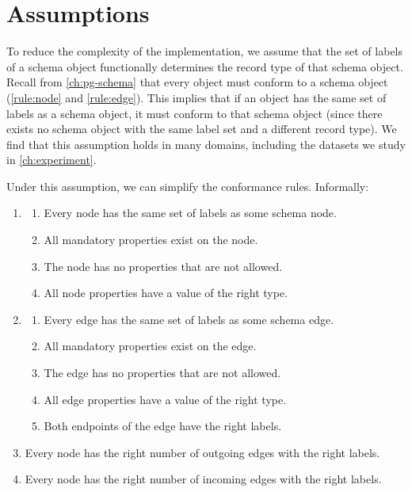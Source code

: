\documentclass{report}
\theoremstyle{definition}
\begin{document}

\section{Assumptions}

To reduce the complexity of the implementation, we assume that the set of labels of a schema object functionally determines the record type of that schema object. Recall from \autoref{ch:pg-schema} that every object must conform to a schema object (\autoref{rule:node} and \ref{rule:edge}). This implies that if an object has the same set of labels as a schema object, it must conform to that schema object (since there exists no schema object with the same label set and a different record type). We find that this assumption holds in many domains, including the datasets we study in \autoref{ch:experiment}.

Under this assumption, we can simplify the conformance rules. Informally:

\begin{enumerate}
  \item
        \begin{enumerate}
          \item\label{rule:simp-node-labels}
                Every node has the same set of labels as some schema node.
          \item\label{rule:simp-node-mandatory-props}
                All mandatory properties exist on the node.
          \item\label{rule:simp-node-allowed-props}
                The node has no properties that are not allowed.
          \item\label{rule:simp-node-datatype}
                All node properties have a value of the right type.
        \end{enumerate}
  \item
        \begin{enumerate}
          \item\label{rule:simp-edge-labels}
                Every edge has the same set of labels as some schema edge.
          \item\label{rule:simp-edge-mandatory-props}
                All mandatory properties exist on the edge.
          \item\label{rule:simp-edge-allowed-props}
                The edge has no properties that are not allowed.
          \item\label{rule:simp-edge-datatype}
                All edge properties have a value of the right type.
          \item\label{rule:simp-edge-endpoints}
                Both endpoints of the edge have the right labels.
        \end{enumerate}
  \item\label{rule:simp-card-out}
        Every node has the right number of outgoing edges with the right labels.
  \item\label{rule:simp-card-in}
        Every node has the right number of incoming edges with the right labels.
\end{enumerate}
\end{document}
